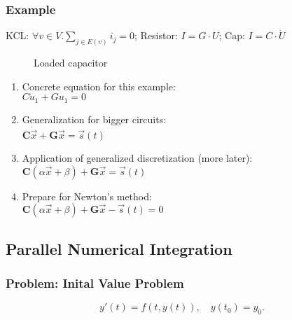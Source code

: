 \begin{frame}
\frametitle{Example}
KCL: \(\forall v \in V. \sum_{j \in E(v)} i_{j} = 0\); Resistor: \(I = G \cdot U\); Cap: \(I = C \cdot \dot{U}\)
\begin{figure}[ht]
    \centering
        \begin{circuitikz}
            
        \end{circuitikz}
    \caption{Loaded capacitor}
\label{fig:cap}
\end{figure}
\pause
\begin{enumerate}[<+->]
    \item Concrete equation for this example:\\
        \(C\dot{u}_1 + Gu_1 = 0\)
    \item Generalization for bigger circuits:\\
        \(\mathbf{C} \dot{\vec{x}} + \mathbf{G} \vec{x} = \vec{s}(t)\)
    \item Application of generalized discretization (more later):\\
        \(\mathbf{C} (\alpha \vec{x} + \beta) + \mathbf{G} \vec{x} = \vec{s}(t)\)
    \item Prepare for Newton's method:\\
        \(\mathbf{C} (\alpha \vec{x} + \beta) + \mathbf{G} \vec{x} - \vec{s}(t)= 0\)
\end{enumerate}
\end{frame}


\subsection{Parallel Numerical Integration}
\begin{frame}
\frametitle{Problem: Inital Value Problem}
\begin{equation*}
y'(t) = f(t,y(t)), \quad y(t_0) = y_0.
\end{equation*}
\end{frame}


